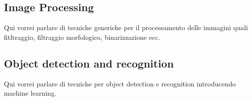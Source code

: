 \subsection{Image Processing}
Qui vorrei parlare di tecniche generiche per il processamento delle immagini quali fitltraggio, filtraggio
morfologico, binarizzazione ecc.

\subsection{Object detection and recognition}	
Qui vorrei parlare di tecniche per object detection e recognition introducendo machine learning.

\endinput